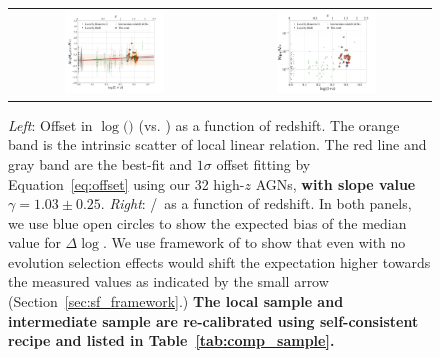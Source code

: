 \documentclass[apj]{emulateapj}
\begin{document}
\begin{figure}
\centering
\begin{tabular}{c c}
{\includegraphics[width=0.5\textwidth]{fig/MBH-Mstar-vz_style1.pdf}}&
{\includegraphics[width=0.5\textwidth]{fig/MBH-Mstar-vz_style0.pdf}}\\
\end{tabular}
\caption{\label{fig:MM-vz} 
 {\it Left}: Offset in  $\log($\mbh$)$ (vs. \smass) as a function of redshift. The orange band is the intrinsic scatter of local linear relation. The red line and gray band are the best-fit and $1\sigma$ offset fitting by Equation~\ref{eq:offset} using our 32 high-$z$ AGNs, {\bf with slope value $\gamma  = 1.03 \pm 0.25$}. {\it Right}: \mbh/\smass\ as a function of redshift. In both panels, we use blue open circles to show the expected bias of the median value for $\Delta \log$\mbh. We use framework of \citet{Schulze2011,Schulze2014} to show that even with no evolution selection effects would shift the expectation higher towards the measured values as indicated by the small arrow (Section~\ref{sec:sf_framework}.) {\bf The local sample and intermediate sample are re-calibrated using self-consistent recipe and listed in Table~\ref{tab:comp_sample}.}}
\end{figure} 
\end{document}
